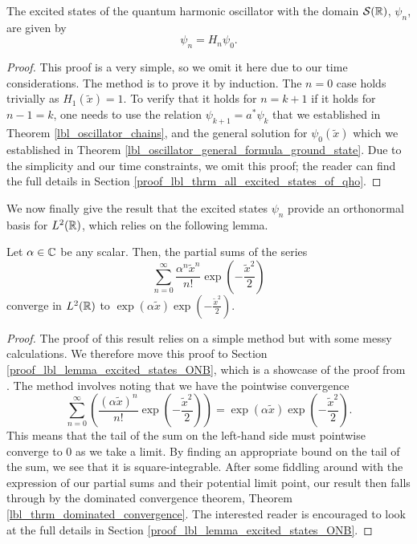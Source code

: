 \begin{theorem}\label{lbl_thrm_all_excited_states_of_qho}
  The excited states of the quantum harmonic oscillator with the domain $\mathcal{S}(\mathbb{R})$, $\psi_n$, are given by
  \begin{equation*}
    \psi_n = H_n \psi_0.
  \end{equation*}
\end{theorem}
\begin{proof}
  This proof is a very simple, so we omit it here due to our time considerations. The method is to prove it by induction. The $n = 0$ case holds trivially as $H_1(\tilde{x}) = 1$. To verify that it holds for $n = k + 1$ if it holds for $n - 1 = k$, one needs to use the relation $\psi_{k+1} = a^* \psi_k$ that we established in Theorem \eqref{lbl_oscillator_chains}, and the general solution for $\psi_0(\tilde{x})$ which we established in Theorem \eqref{lbl_oscillator_general_formula_ground_state}. Due to the simplicity and our time constraints, we omit this proof; the reader can find the full details in Section \eqref{proof_lbl_thrm_all_excited_states_of_qho}.
\end{proof}

We now finally give the result that the excited states $\psi_n$ provide an orthonormal basis for $L^2(\mathbb{R})$, which relies on the following lemma.

\begin{lemma}\label{lbl_lemma_excited_states_ONB}
  Let $\alpha \in \mathbb{C}$ be any scalar. Then, the partial sums of the series
  \begin{equation*}
    \sum_{n=0}^{\infty} \frac{\alpha^n \tilde{x}^n}{n!}\exp\left(-\frac{\tilde{x}^2}{2}\right)
  \end{equation*}
  converge in $L^2(\mathbb{R})$ to $\exp\left(\alpha \tilde{x}\right)\exp\left(-\frac{\tilde{x}^2}{2}\right)$.
\end{lemma}
\begin{proof}
  The proof of this result relies on a simple method but with some messy calculations. We therefore move this proof to Section \eqref{proof_lbl_lemma_excited_states_ONB}, which is a showcase of the proof from {\cite[Lemma 11.5]{Hall2013}}. The method involves noting that we have the pointwise convergence
  \begin{equation*}
    \sum_{n=0}^{\infty} \left(\frac{(\alpha \tilde{x})^n}{n!} \exp\left( -\frac{\tilde{x}^2}{2} \right)\right)
    =
    \exp\left(\alpha \tilde{x}\right) \exp\left( -\frac{\tilde{x}^2}{2} \right).
  \end{equation*}
  This means that the tail of the sum on the left-hand side must pointwise converge to 0 as we take a limit. By finding an appropriate bound on the tail of the sum, we see that it is square-integrable. After some fiddling around with the expression of our partial sums and their potential limit point, our result then falls through by the dominated convergence theorem, Theorem \eqref{lbl_thrm_dominated_convergence}. The interested reader is encouraged to look at the full details in Section \eqref{proof_lbl_lemma_excited_states_ONB}.
\end{proof}

